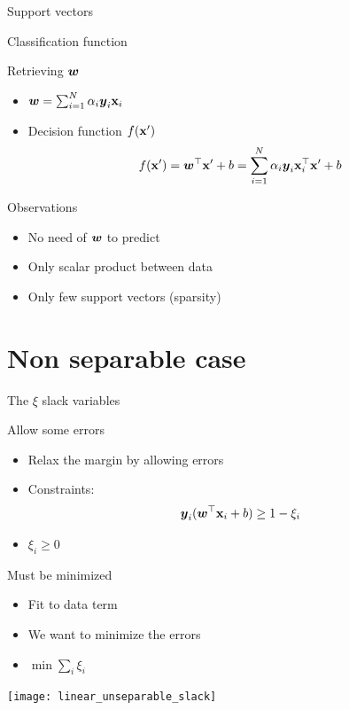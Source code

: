 \documentclass[11pt, pdf, compress, handout]{beamer}
\begin{document}
\begin{frame}[label={sec:orgb19430f}]{Support vectors}
\end{frame}

\begin{frame}[label={sec:org8a8fd9b}]{Classification function}
  \begin{block}{Retrieving ${\boldsymbol{w}}$}
    \begin{itemize}
    \item ${\boldsymbol{w}} = \sum_{i=1}^N \alpha_i {\boldsymbol{y}}_i {\mathbf{x}}_i$
    \item Decision function $f({\mathbf{x}}')$
      $$f({\mathbf{x}}') = {\boldsymbol{w}}^\top {\mathbf{x}}' + b = \sum_{i=1}^N
      \alpha_i {\boldsymbol{y}}_i {\mathbf{x}}_i^\top{\mathbf{x}}' + b$$
    \end{itemize}
  \end{block}
  \begin{block}{Observations}
    \begin{itemize}
    \item No need of ${\boldsymbol{w}}$ to predict
    \item Only scalar product between data
    \item Only few support vectors (sparsity)
    \end{itemize}
  \end{block}
\end{frame}
\section{Non separable case}
\begin{frame}[plain]
\end{frame}
\label{sec:orgd1cda88}
\begin{frame}[label={sec:orga7cd2a7}]{The \(\xi\) slack variables}
  \begin{block}{Allow some errors}
    \begin{itemize}
    \item Relax the margin by allowing errors
    \item Constraints:
      $$
      {\boldsymbol{y}}_i({\boldsymbol{w}}^\top {\mathbf{x}}_i +b) \geq 1 - \xi_i
      $$
    \item $\xi_i \geq 0$
    \end{itemize}
  \end{block}
  \begin{block}{Must be minimized}
    \begin{itemize}
    \item Fit to data term
    \item We want to minimize the errors
    \item $\min \sum_i \xi_i$
    \end{itemize}
  \end{block}
\end{frame}
\begin{frame}
  \texttt{[image: linear\_unseparable\_slack]}            
\end{frame}
\end{document}
